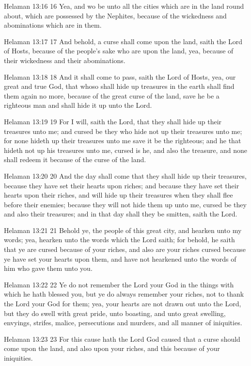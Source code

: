 Helaman 13:16
 16 Yea, and wo be unto all the cities which are in the land
round about, which are possessed by the Nephites, because of the
wickedness and abominations which are in them.

Helaman 13:17
 17 And behold, a curse shall come upon the land, saith the Lord
of Hosts, because of the people's sake who are upon the land,
yea, because of their wickedness and their abominations.

Helaman 13:18
 18 And it shall come to pass, saith the Lord of Hosts, yea, our
great and true God, that whoso shall hide up treasures in the
earth shall find them again no more, because of the great curse
of the land, save he be a righteous man and shall hide it up unto
the Lord.

Helaman 13:19
 19 For I will, saith the Lord, that they shall hide up their
treasures unto me; and cursed be they who hide not up their
treasures unto me; for none hideth up their treasures unto me
save it be the righteous; and he that hideth not up his treasures
unto me, cursed is he, and also the treasure, and none shall
redeem it because of the curse of the land.

Helaman 13:20
 20 And the day shall come that they shall hide up their
treasures, because they have set their hearts upon riches; and
because they have set their hearts upon their riches, and will
hide up their treasures when they shall flee before their
enemies; because they will not hide them up unto me, cursed be
they and also their treasures; and in that day shall they be
smitten, saith the Lord.

Helaman 13:21
 21 Behold ye, the people of this great city, and hearken unto my
words; yea, hearken unto the words which the Lord saith; for
behold, he saith that ye are cursed because of your riches, and
also are your riches cursed because ye have set your hearts upon
them, and have not hearkened unto the words of him who gave them
unto you.

Helaman 13:22
 22 Ye do not remember the Lord your God in the things with which
he hath blessed you, but ye do always remember your riches, not
to thank the Lord your God for them; yea, your hearts are not
drawn out unto the Lord, but they do swell with great pride, unto
boasting, and unto great swelling, envyings, strifes, malice,
persecutions and murders, and all manner of iniquities.

Helaman 13:23
 23 For this cause hath the Lord God caused that a curse should
come upon the land, and also upon your riches, and this because
of your iniquities.


